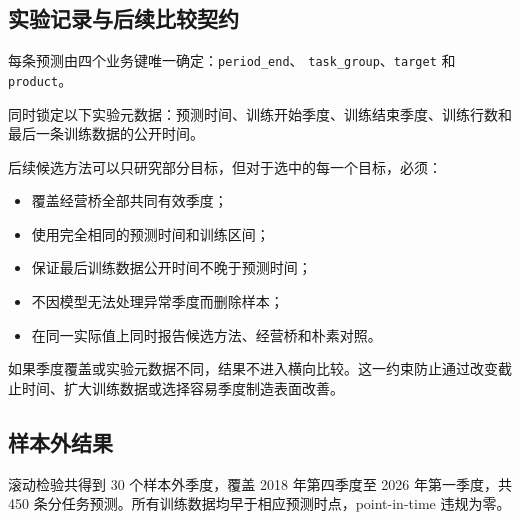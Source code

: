\documentclass[11pt,a4paper]{ctexart}
\begin{document}
\subsection{实验记录与后续比较契约}

每条预测由四个业务键唯一确定：\texttt{period\_end}、
\texttt{task\_group}、\texttt{target} 和 \texttt{product}。

同时锁定以下实验元数据：预测时间、训练开始季度、训练结束季度、训练行数和最后一条训练数据的公开时间。

后续候选方法可以只研究部分目标，但对于选中的每一个目标，必须：

\begin{itemize}
  \item 覆盖经营桥全部共同有效季度；
  \item 使用完全相同的预测时间和训练区间；
  \item 保证最后训练数据公开时间不晚于预测时间；
  \item 不因模型无法处理异常季度而删除样本；
  \item 在同一实际值上同时报告候选方法、经营桥和朴素对照。
\end{itemize}

如果季度覆盖或实验元数据不同，结果不进入横向比较。这一约束防止通过改变截止时间、扩大训练数据或选择容易季度制造表面改善。

\subsection{样本外结果}

滚动检验共得到 30 个样本外季度，覆盖 2018 年第四季度至 2026 年第一季度，共 450 条分任务预测。所有训练数据均早于相应预测时点，point-in-time 违规为零。
\end{document}
